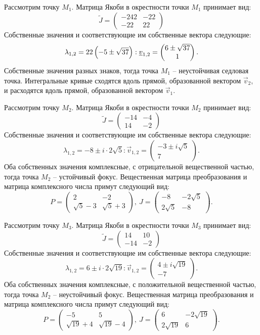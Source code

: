 		Рассмотрим точку $M_1$. Матрица Якоби в окрестности точки $M_1$ принимает вид:
		\[
			\tilde{J} = \begin{pmatrix}
				-242 & -22 \\
				-22 & 22
			\end{pmatrix}
		\]
		Собственные значения и соответствующие им собственные вектора следующие:
		\[ \lambda_{1, 2} = 22 \left( -5 \pm \sqrt{37} \right): \underline{v}_{1, 2} = \begin{pmatrix} 6 \pm \sqrt{37} \\ 1 \end{pmatrix}. \]
		Собственные значения разных знаков, тогда точка $M_1$ -- неустойчивая седловая точка. Интегральные кривые сходятся вдоль прямой, образованной вектором $\vec{v}_2$, и расходятся вдоль прямой, образованной вектором $\vec{v}_1$.

		Рассмотрим точку $M_2$. Матрица Якоби в окрестности точки $M_2$ принимает вид:
		\[
			\tilde{J} = \begin{pmatrix}
				-14 & -4 \\
				14 & -2
			\end{pmatrix}
		\]
		Собственные значения и соответствующие им собственные вектора следующие:
		\[ \lambda_{1, 2} = -8 \pm i \cdot 2\sqrt{5}: \vec{v}_{1, 2} = \begin{pmatrix} -3 \pm i \sqrt{5} \\ 7 \end{pmatrix}. \]
		Оба собственных значения комплексные, с отрицательной вещественной частью, тогда точка $M_2$ -- устойчивый фокус. Вещественная матрица преобразования и матрица комплексного числа примут следующий вид:
		\[ P = \begin{pmatrix} 2 & -2 \\ \sqrt{5} - 3 & \sqrt{5} + 3 \end{pmatrix}, ~ J = \begin{pmatrix} -8 & -2\sqrt{5} \\ 2\sqrt{5} & -8 \end{pmatrix}. \]

		Рассмотрим точку $M_3$. Матрица Якоби в окрестности точки $M_3$ принимает вид:
		\[
			\tilde{J} = \begin{pmatrix}
				14 & 10 \\
				-14 & -2
			\end{pmatrix}
		\]
		Собственные значения и соответствующие им собственные вектора следующие:
		\[ \lambda_{1, 2} = 6 \pm i \cdot 2\sqrt{19}: \vec{v}_{1, 2} = \begin{pmatrix} 4 \pm i \sqrt{19} \\ -7 \end{pmatrix}. \]
		Оба собственных значения комплексные, с положительной вещественной частью, тогда точка $M_2$ -- неустойчивый фокус. Вещественная матрица преобразования и матрица комплексного числа примут следующий вид:
		\[ P = \begin{pmatrix} -5 & 5 \\ \sqrt{19} + 4 & \sqrt{19} - 4 \end{pmatrix}, ~ J = \begin{pmatrix} 6 & -2\sqrt{19} \\ 2\sqrt{19} & 6 \end{pmatrix}. \]


